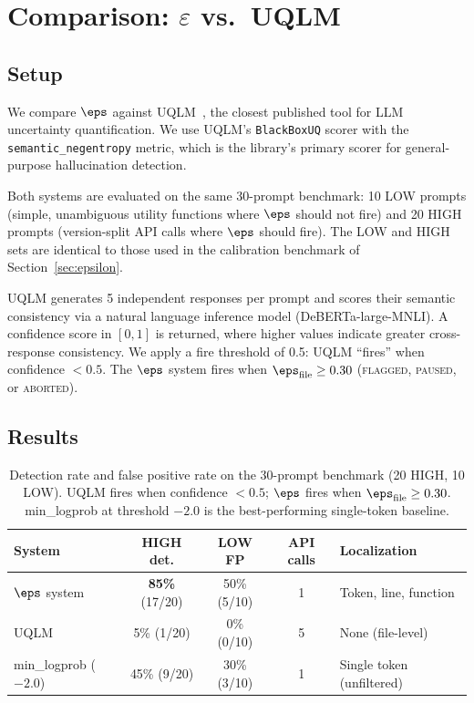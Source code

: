 \section{Comparison: \texorpdfstring{$\varepsilon$}{epsilon} vs.\ UQLM}
\label{sec:comparison}

\subsection{Setup}
\label{sec:comp-setup}

We compare $\eps$ against UQLM~\cite{uqlm2024}, the closest published tool
for LLM uncertainty quantification. We use UQLM's \texttt{BlackBoxUQ} scorer
with the \texttt{semantic\_negentropy} metric, which is the library's primary
scorer for general-purpose hallucination detection.

Both systems are evaluated on the same 30-prompt benchmark: 10 LOW prompts
(simple, unambiguous utility functions where $\eps$ should not fire) and 20
HIGH prompts (version-split API calls where $\eps$ should fire). The LOW and
HIGH sets are identical to those used in the calibration benchmark of
Section~\ref{sec:epsilon}.

UQLM generates 5 independent responses per prompt and scores their semantic
consistency via a natural language inference model (DeBERTa-large-MNLI).
A confidence score in $[0, 1]$ is returned, where higher values indicate
greater cross-response consistency. We apply a fire threshold of 0.5:
UQLM ``fires'' when confidence $< 0.5$. The $\eps$ system fires when
$\eps_\text{file} \geq 0.30$ (\textsc{flagged}, \textsc{paused}, or
\textsc{aborted}).

\subsection{Results}
\label{sec:comp-results}

\begin{table}[h]
\centering
\caption{Detection rate and false positive rate on the 30-prompt benchmark
         (20 HIGH, 10 LOW). UQLM fires when confidence $< 0.5$;
         $\eps$ fires when $\eps_{\text{file}} \geq 0.30$.
         min\_logprob at threshold $-2.0$ is the best-performing
         single-token baseline.}
\label{tab:comparison}
\small
\begin{tabular}{lcccp{2.6cm}}
\toprule
\textbf{System} & \textbf{HIGH det.}
                & \textbf{LOW FP}
                & \textbf{API calls}
                & \textbf{Localization} \\
\midrule
$\eps$ system        & \textbf{85\%} (17/20) & 50\% (5/10) & 1 & Token, line, function \\
UQLM                 & 5\%   (1/20)           & 0\%  (0/10) & 5 & None (file-level) \\
min\_logprob ($-2.0$)& 45\%  (9/20)           & 30\% (3/10) & 1 & Single token (unfiltered) \\
\bottomrule
\end{tabular}
\normalsize
\end{table}

